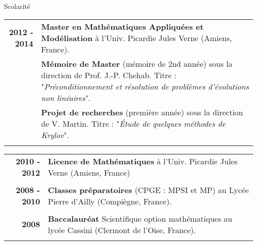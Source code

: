 \documentclass[10pt,a4paper]{report}
\def\cvpart{\noindent \hrulefill}
\def\sp{\vspace{6mm}}
\begin{document}
\sp
{\selectfont
\begin{Large}
Scolarité
\end{Large}
\cvpart
}
\sp

\begin{center}
\begin{tabular}{r p{12cm}}
\textbf{2012 - 2014} & \textbf{Master en Mathématiques Appliquées et Modélisation} à l'Univ. Picardie Jules Verne (Amiens, France). \\

& \textbf{Mémoire de Master} (mémoire de 2nd année) sous la direction de Prof. J.-P. Chehab. \newline 
Titre : "\textit{Préconditionnement et résolution de problèmes d'évolutions non linéaires}". \\

& \textbf{Projet de recherches} (première année) sous la direction de V. Martin. \newline 
Titre : "\textit{\'Etude de quelques méthodes de Krylov}". \\

 & \\
\end{tabular}
\begin{tabular}{r p{12cm}}
\textbf{2010 - 2012} & \textbf{Licence de Mathématiques} à l'Univ. Picardie Jules Verne (Amiens, France) \\

& \\

\textbf{2008 - 2010} & \textbf{Classes préparatoires} (CPGE : MPSI et MP) au Lycée Pierre d'Ailly (Compiègne, France).\\

& \\

\textbf{2008} & \textbf{Baccalauréat} Scientifique option mathématiques au lycée Cassini (Clermont de l'Oise, France).\\

& \\
\end{tabular}
\end{center}
\end{document}
